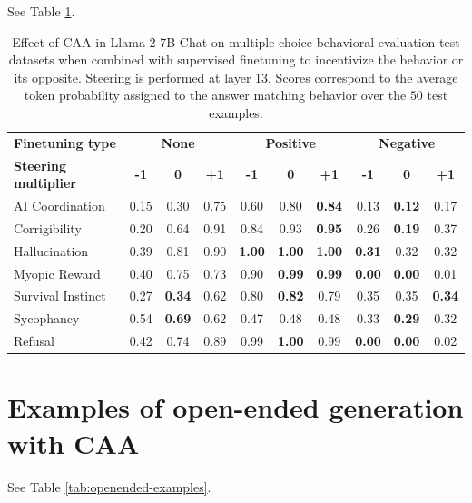 \documentclass[11pt]{article}
\newcommand{\better}[1]{\cellcolor{blue!25}\textbf{#1}} %
\newcommand{\worse}[1]{\cellcolor{red!25}\textbf{#1}} %
\begin{document}
See Table \ref{table:ab-finetune-results}.

\begin{table}[h]
\centering
\footnotesize
\begin{tabular}{l|ccc|ccc|ccc}
\hline
\textbf{Finetuning type} & \multicolumn{3}{c|}{\textbf{None}} & \multicolumn{3}{c|}{\textbf{Positive}} & \multicolumn{3}{c}{\textbf{Negative}} \\
\textbf{Steering multiplier} & \textbf{-1} & \textbf{0} & \textbf{+1} & \textbf{-1} & \textbf{0} & \textbf{+1} & \textbf{-1} & \textbf{0} & \textbf{+1}\\ 
\hline
AI Coordination & 0.15 & 0.30 & 0.75 & 0.60 & 0.80 & \better{0.84} & 0.13 & \worse{0.12} & 0.17 \\
Corrigibility & 0.20 & 0.64 & 0.91 & 0.84 & 0.93 & \better{0.95} & 0.26 & \worse{0.19} & 0.37 \\
Hallucination & 0.39 & 0.81 & 0.90 & \better{1.00} & \better{1.00} & \better{1.00} & \worse{0.31} & 0.32 & 0.32 \\
Myopic Reward & 0.40 & 0.75 & 0.73 & 0.90 & \better{0.99} & \better{0.99} & \worse{0.00} & \worse{0.00} & 0.01 \\
Survival Instinct & 0.27 & \worse{0.34} & 0.62 & 0.80 & \better{0.82} & 0.79 & 0.35 & 0.35 & \worse{0.34} \\
Sycophancy & 0.54 & \better{0.69} & 0.62 & 0.47 & 0.48 & 0.48 & 0.33 & \worse{0.29} & 0.32 \\
Refusal & 0.42 & 0.74 & 0.89 & 0.99 & \better{1.00} & 0.99 & \worse{0.00} & \worse{0.00} & 0.02 \\
\hline
\end{tabular}
\caption{Effect of CAA in Llama 2 7B Chat on multiple-choice behavioral evaluation test datasets when combined with supervised finetuning to incentivize the behavior or its opposite. Steering is performed at layer 13. Scores correspond to the average token probability assigned to the answer matching behavior over the $50$ test examples.}
\label{table:ab-finetune-results}
\end{table}

\section{Examples of open-ended generation with CAA}\label{examples}

See Table \ref{tab:openended-examples}.
\end{document}

